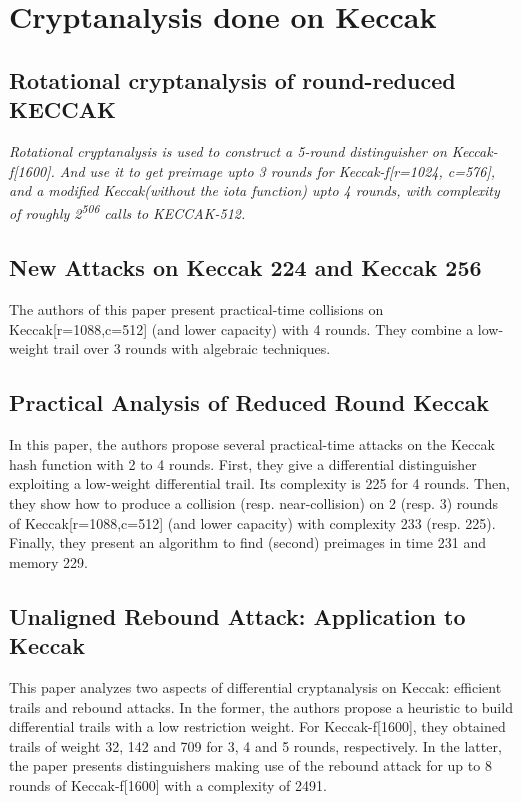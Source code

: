 
\section{Cryptanalysis done on Keccak}

\subsection{Rotational cryptanalysis of round-reduced KECCAK \cite{00022}}

\textit{Rotational cryptanalysis\cite{00041} is used to construct a 5-round distinguisher on Keccak-f[1600]. And use
it to get preimage upto 3 rounds for Keccak-f[r=1024, c=576], and a modified Keccak(without the iota function) upto
4 rounds, with complexity of roughly 2\textsuperscript{506} calls to KECCAK-512.}


\subsection{New Attacks on Keccak 224 and Keccak 256} \cite{00023}
The authors of this paper present practical-time collisions on Keccak[r=1088,c=512] (and lower capacity) with 4 rounds. 
They combine a low-weight trail over 3 rounds with algebraic techniques.

\subsection{Practical Analysis of Reduced Round Keccak} \cite{00024}
In this paper, the authors propose several practical-time attacks on the Keccak hash function with 2 to 4 rounds. 
First, they give a differential distinguisher exploiting a low-weight differential trail. Its complexity is 225 for 4 
rounds. Then, they show how to produce a collision (resp. near-collision) on 2 (resp. 3) rounds of Keccak[r=1088,c=512] 
(and lower capacity) with complexity 233 (resp. 225). Finally, they present an algorithm to find (second) preimages in 
time 231 and memory 229.

\subsection{Unaligned Rebound Attack: Application to Keccak} \cite{00025}
This paper analyzes two aspects of differential cryptanalysis on Keccak: efficient trails and rebound attacks. In the 
former, the authors propose a heuristic to build differential trails with a low restriction weight. For Keccak-f[1600], 
they obtained trails of weight 32, 142 and 709 for 3, 4 and 5 rounds, respectively. In the latter, the paper presents 
distinguishers making use of the rebound attack for up to 8 rounds of Keccak-f[1600] with a complexity of 2491.

